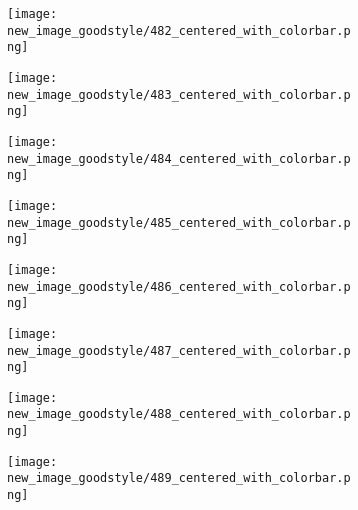 \documentclass[a4paper,12pt]{article}
\begin{document}
\begin{figure}[H]
  \begin{subfigure}{0.11\textwidth}
    \texttt{[image: new\_image\_goodstyle/482\_centered\_with\_colorbar.png]}
  \end{subfigure}
  \hfill
  \begin{subfigure}{0.11\textwidth}
    \texttt{[image: new\_image\_goodstyle/483\_centered\_with\_colorbar.png]}
  \end{subfigure}
  \hfill
  \begin{subfigure}{0.11\textwidth}
    \texttt{[image: new\_image\_goodstyle/484\_centered\_with\_colorbar.png]}
  \end{subfigure}
  \hfill
  \begin{subfigure}{0.11\textwidth}
    \texttt{[image: new\_image\_goodstyle/485\_centered\_with\_colorbar.png]}
  \end{subfigure}
  \hfill
  \begin{subfigure}{0.11\textwidth}
    \texttt{[image: new\_image\_goodstyle/486\_centered\_with\_colorbar.png]}
  \end{subfigure}
  \hfill
  \begin{subfigure}{0.11\textwidth}
    \texttt{[image: new\_image\_goodstyle/487\_centered\_with\_colorbar.png]}
  \end{subfigure}
  \hfill
  \begin{subfigure}{0.11\textwidth}
    \texttt{[image: new\_image\_goodstyle/488\_centered\_with\_colorbar.png]}
  \end{subfigure}
  \hfill
  \begin{subfigure}{0.11\textwidth}
    \texttt{[image: new\_image\_goodstyle/489\_centered\_with\_colorbar.png]}
  \end{subfigure}
  \hfill
\end{figure}
\end{document}
